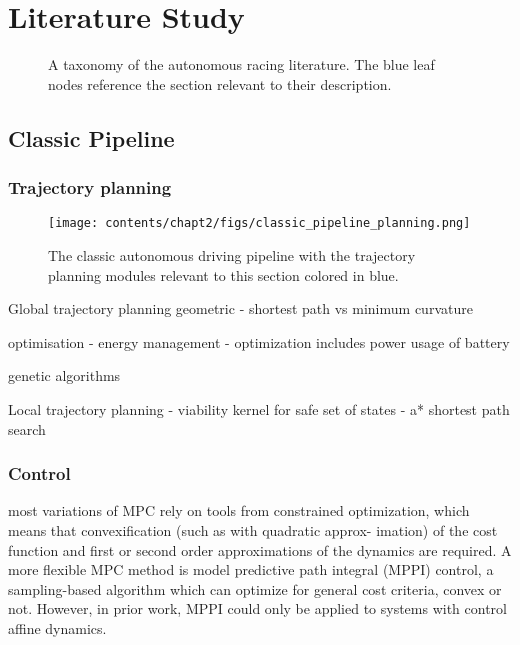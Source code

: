 \chapter{Literature Study}
\label{chp:litreview}


\begin{figure}[htb!]
    \centering
    
    \caption[A taxonomy of the autonomous racing literature with sections]{A taxonomy of the autonomous racing literature. The blue leaf nodes reference the section relevant to their description.}
    \label{fig:my_neuron}
\end{figure}

\section{Classic Pipeline}
\label{sec:classic}

\subsection{Trajectory planning}
\label{sec:trajectory_planning}

\begin{figure}[h]
    \centering
    \texttt{[image: contents/chapt2/figs/classic\_pipeline\_planning.png]}
    \caption{The classic autonomous driving pipeline with the trajectory planning modules relevant to this section colored in blue.}
    \label{fig:trajectory_planning}
\end{figure}

Global trajectory planning
geometric
\cite{Braghin2008} - shortest path vs minimum curvature

optimisation
\cite{Herrmann2019} - energy management
\cite{Herrmann2020} - optimization includes power usage of battery

genetic algorithms
\cite{Cardamone2010}
\cite{Vesel}

Local trajectory planning
\cite{Liniger2015a} - viability kernel for safe set of states
\cite{keefer2022} 
\cite{Wang2021}
\cite{Jeon2013} - a* shortest path search

\subsection{Control}
\label{sec:control}

most variations of MPC rely on tools from constrained optimization, which means that convexification (such as with quadratic approx- imation) of the cost function and first or second order approximations of the dynamics are required.
A more flexible MPC method is model predictive path
integral (MPPI) control, a sampling-based algorithm which can optimize for general cost criteria, convex or not. However, in prior work, MPPI could only be applied to systems with control affine dynamics.


